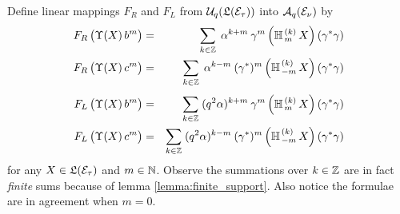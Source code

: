 \begin{defn} \label{def:Eq2:Fourier_transforms}
Define linear mappings $F_R$ and $F_L$ from
${\mathcal U}_q\!\left(\mathfrak{L}(\mathcal E_\tau)\right)$ into ${\mathcal A}_q(\mathcal E_\nu)$ by
\begin{eqnarray*}
 F_R\left(\vertM\Upsilon(X)\, b^m\right)
    &=& \sum_{k\in\ZZ} \; \alpha^{k+m} \: \gamma^m
    \left(\YaH{m}{k}\,X\right)(\gamma^*\gamma) \\
 F_R\left(\vertM\Upsilon(X)\, c^m\right)
    &=& \sum_{k\in\ZZ} \; \alpha^{k-m} \: (\gamma^*)^m
    \left(\YaH{-m}{k}\,X\right)(\gamma^*\gamma) \\
    \vertXL
 F_L\left(\vertM\Upsilon(X)\, b^m\right)
    &=& \sum_{k\in\ZZ}  \; (q^2 \alpha)^{k+m}\: \gamma^m
    \left(\YaH{m}{k}\,X\right)(\gamma^*\gamma) \\
 F_L\left(\vertM\Upsilon(X)\, c^m\right)
    &=& \sum_{k\in\ZZ}  \; (q^2 \alpha)^{k-m}\: (\gamma^*)^m
    \left(\YaH{-m}{k}\,X\right)(\gamma^*\gamma)
\end{eqnarray*}
for any $X\in \mathfrak{L}(\mathcal E_\tau)$ and $m\in \mathbb{N}$.
Observe the summations over $k\in\mathbb{Z}$ are in fact {\em finite\/} sums
because of lemma \ref{lemma:finite_support}. Also notice the
formulae are in agreement when $m=0$.
\end{defn}


